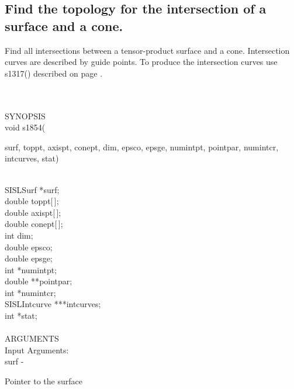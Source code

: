 \subsection{Find the topology for the intersection of a surface and a cone.}
\begin{minipg1}
  Find all intersections between a tensor-product surface and a cone.
  Intersection curves are described by guide points.
  To produce the intersection curves use s1317() described on page \pageref{s1317}.
\end{minipg1} \\ \\
SYNOPSIS\\
        \>void s1854(\begin{minipg3}
                        {\fov surf}, {\fov toppt}, {\fov axispt}, {\fov conept}, {\fov dim}, {\fov epsco}, {\fov epsge}, {\fov numintpt}, {\fov pointpar},
                        {\fov numintcr}, {\fov intcurves}, {\fov stat})
                \end{minipg3}\\[0.3ex]
                \>\>    SISLSurf        \>      *{\fov surf};\\
                \>\>    double  \>      {\fov toppt}[\,];\\
                \>\>    double  \>      {\fov axispt}[\,];\\
                \>\>    double  \>      {\fov conept}[\,];\\
                \>\>    int     \>      {\fov dim};\\
                \>\>    double  \>      {\fov epsco};\\
                \>\>    double  \>      {\fov epsge};\\
                \>\>    int     \>      *{\fov numintpt};\\
                \>\>    double  \>      **{\fov pointpar};\\
                \>\>    int     \>      *{\fov numintcr};\\
                \>\>    SISLIntcurve\>  ***{\fov intcurves};\\
                \>\>    int     \>      *{\fov stat};\\
\\
ARGUMENTS\\
        \>Input Arguments:\\
        \>\>    {\fov surf}\> - \>      \begin{minipg2}
                                Pointer to the surface
                                \end{minipg2}\\
